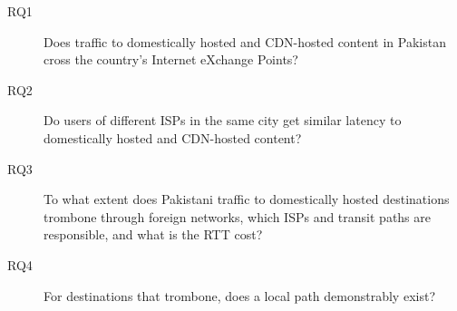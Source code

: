 \documentclass[sigconf,anonymous,10pt]{acmart}
\begin{document}

\begin{description}
  \item[RQ1] Does traffic to domestically hosted and CDN-hosted content in Pakistan cross the country's Internet eXchange Points?
  \item[RQ2] Do users of different ISPs in the same city get similar latency to domestically hosted and CDN-hosted content? 
  \item[RQ3] To what extent does Pakistani traffic to domestically hosted destinations trombone through foreign networks, which ISPs and transit paths are responsible, and what is the RTT cost?
  \item[RQ4] For destinations that trombone, does a local path demonstrably exist?
\end{description}





\end{document}
